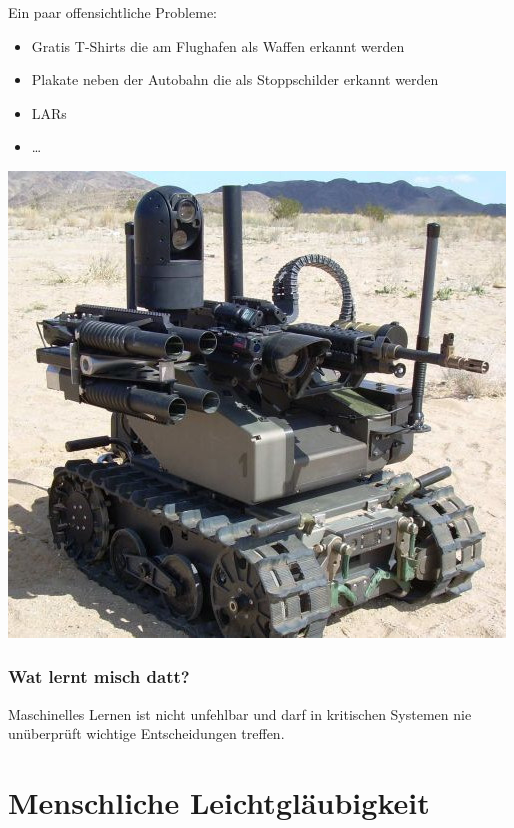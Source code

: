 \documentclass[aspectratio=43]{beamer}
\begin{document}
\begin{frame}
Ein paar offensichtliche Probleme:
\bigskip
\begin{multicols}{2}
\begin{itemize}
\item Gratis T-Shirts die am Flughafen als Waffen erkannt werden
\item Plakate neben der Autobahn die als Stoppschilder erkannt werden
\item LARs
\item \dots
\end{itemize}
\columnbreak
\includegraphics[scale=0.275]{images/lars.jpg} 
\end{multicols}
\end{frame}

\begin{frame}
\frametitle{Wat lernt misch datt?}
\begin{center}
\color{red}
\large
Maschinelles Lernen ist nicht unfehlbar und darf in kritischen Systemen nie 
unüberprüft wichtige Entscheidungen treffen.
\end{center}
\end{frame}


\section{Menschliche Leichtgläubigkeit}
\end{document}
